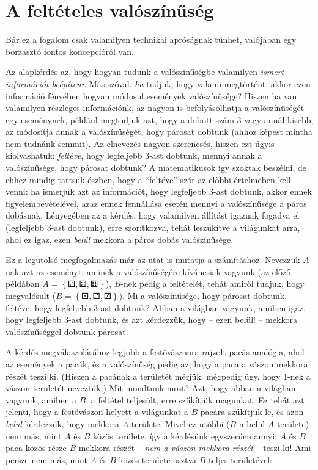 \documentclass[magyar,]{book}
\begin{document}
\hypertarget{a-feltuxe9teles-valuxf3szuxednux171suxe9g}{%
\section{A feltételes valószínűség}\label{a-feltuxe9teles-valuxf3szuxednux171suxe9g}}

Bár ez a fogalom csak valamilyen technikai apróságnak tűnhet, valójában egy borzasztó fontos koncepcióról van.

Az alapkérdés az, hogy hogyan tudunk a valószínűségbe valamilyen \emph{ismert információt beépíteni}. Más szóval, \emph{ha} tudjuk, hogy valami megtörtént, akkor ezen információ fényében hogyan módosul események valószínűsége? Hiszen ha van valamilyen részleges információnk, az nagyon is befolyásolhatja a valószínűségét egy eseménynek, például megtudjuk azt, hogy a dobott szám 3 vagy annál kisebb, az módosítja annak a valószínűségét, hogy párosat dobtunk (ahhoz képest mintha nem tudnánk semmit). Az elnevezés nagyon szerencsés, hiszen ezt úgyis kiolvashatuk: \emph{feltéve}, hogy legfeljebb 3-ast dobtunk, mennyi annak a valószínűsége, hogy párosat dobtunk? A matematikusok így szoktak beszélni, de ehhez mindig tartsuk észben, hogy a \enquote{feltéve} szót az előbbi értelmeben kell venni: ha ismerjük azt az információt, hogy legfeljebb 3-ast dobtunk, akkor ennek figyelembevételével, azaz ennek fennállása esetén mennyi a valószínűsége a páros dobásnak. Lényegében az a kérdés, hogy valamilyen állítást igaznak fogadva el (legfeljebb 3-ast dobtunk), erre szorítkozva, tehát leszűkítve a világunkat arra, ahol ez igaz, ezen \emph{belül} mekkora a páros dobás valószínűsége.

Ez a legutolsó megfogalmazás már az utat is mutatja a számításhoz. Nevezzük \(A\)-nak azt az eseményt, aminek a valószínűségére kíváncsiak vagyunk (az előző példában \(A=\left\{⚁,⚃,⚅\right\}\)), \(B\)-nek pedig a feltételét, tehát amiről tudjuk, hogy megvalósult (\(B=\left\{⚀,⚁,⚂\right\}\)). Mi a valószínűsége, hogy párosat dobtunk, feltéve, hogy legfeljebb 3-ast dobtunk? Abban a világban vagyunk, amiben igaz, hogy legfeljebb 3-ast dobtunk, és azt kérdezzük, hogy -- ezen belül! -- mekkora valószínűséggel dobtunk párosat.

A kérdés megválaszolásához legjobb a festővászonra rajzolt pacás analógia, ahol az események a pacák, és a valószínűség pedig az, hogy a paca a vászon mekkora részét teszi ki. (Hiszen a pacának a területét mérjük, mégpedig úgy, hogy 1-nek a vászon területét neveztük.) Mit mondtunk most? Azt, hogy abban a világban vagyunk, amiben a \(B\), a feltétel teljesült, erre szűkítjük magunkat. Ez tehát azt jelenti, hogy a festővászon helyett a világunkat a \(B\) pacára szűkítjük le, és azon \emph{belül} kérdezzük, hogy mekkora \(A\) területe. Mivel ez utóbbi (\(B\)-n belül \(A\) területe) nem más, mint \(A\) és \(B\) közös területe, így a kérdésünk egyszerűen annyi: \(A\) és \(B\) paca közös része \(B\) mekkora részét -- \emph{nem a vászon mekkora részét} -- teszi ki! Ami persze nem más, mint \(A\) és \(B\) közös területe osztva \(B\) teljes területével:
\end{document}
